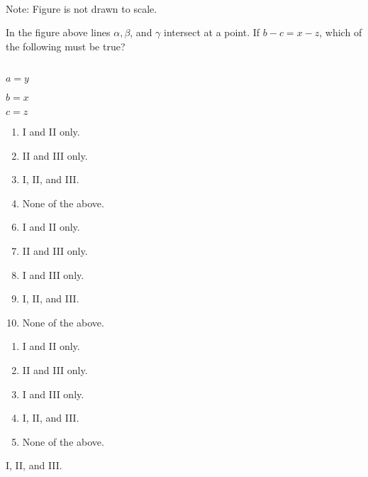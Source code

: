  
\begin{center}\\
Note: Figure is not drawn to scale.\end{center}\vspace{-3mm}
In the figure above lines $\alpha, \beta$, and $\gamma$ intersect at a point.  If $b-c=x-z$, which of the following must be true?\\ \\
\begin{enumerate*}[label=\hspace{2mm}\Roman*.]
\item $a=y$ \item $b=x$ \item $c=z$
\end{enumerate*}  


\ifsat
	\begin{enumerate}[label=\Alph*)]
		\item I and II only. 
		\item II and III only.  
		\item I, II, and III. %
		\item None of the above.
	\end{enumerate}
\else
\fi

\ifacteven
	\begin{enumerate}[label=\textbf{\Alph*.},itemsep=\fill,align=left]
		\setcounter{enumii}{5}
		\item I and II only. 
		\item II and III only.  
		\item I and III only. 
		\addtocounter{enumii}{1}
		\item I, II, and III. %
		\item None of the above.
	\end{enumerate}
\else
\fi

\ifactodd
	\begin{enumerate}[label=\textbf{\Alph*.},itemsep=\fill,align=left]
		\item I and II only. 
		\item II and III only.  
		\item I and III only. 
		\item I, II, and III. %
		\item None of the above.
	\end{enumerate}
\else
\fi

\ifgridin
 I, II, and III. %
		
\else
\fi

